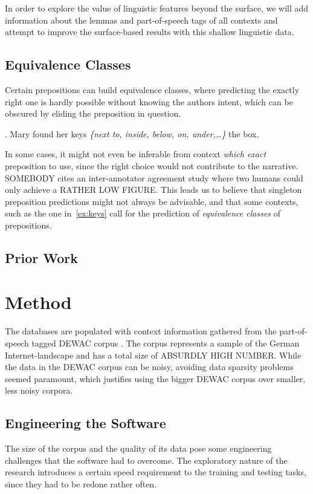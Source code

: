 \documentclass[draft,12pt]{article}
\begin{document}
In order to explore the value of linguistic features beyond the surface, we will
add information about the lemmas and part-of-speech tags of all contexts and
attempt to improve the surface-based results with this shallow linguistic data.

\subsection{Equivalence Classes} %
\label{sec:eqclass}              %
Certain prepositions can build equivalence classes, where
predicting the exactly right one is hardly possible without knowing the authors
intent, which can be obscured by eliding the preposition in question.

\ex. Mary found her keys \textit{\{next to, inside, below, on, under,\ldots{}\}} the box.
\label{ex:keys}

In some cases, it might not even be inferable from context \textit{which exact}
preposition to use, since the right choice would not contribute to the
narrative. SOMEBODY %
cites an inter-annotator agreement study where two humans could only achieve a
RATHER LOW FIGURE. %
This leads us to believe that singleton preposition predictions might not always
be advisable, and that some contexts, such as the one in~\ref{ex:keys} call for
the prediction of \textit{equivalence classes} of prepositions.

\subsection{Prior Work}

\section{Method}

The databases are populated with context information gathered from the
part-of-speech tagged DEWAC corpus \citep{baroniETAL2008}. The corpus represents
a sample of the German Internet-landscape and has a total size of ABSURDLY HIGH
NUMBER. %
While the data in the DEWAC corpus can be noisy, avoiding data sparsity
problems seemed paramount, which justifies using the bigger DEWAC
corpus over smaller, less noisy corpora.

\subsection{Engineering the Software}
The size of the corpus and the quality of its data pose some engineering
challenges that the software had to overcome. The exploratory nature of the
research introduces a certain speed requirement to the training and testing
tasks, since they had to be redone rather often.
\end{document}
